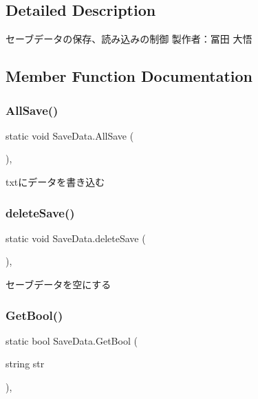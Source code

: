 \subsection{Detailed Description}
セーブデータの保存、読み込みの制御 製作者：冨田 大悟 



\subsection{Member Function Documentation}
\mbox{\label{class_save_data_a0e53b6d48717b1ee274041ed6e4a2cbe}} 
\subsubsection{\texorpdfstring{All\+Save()}{AllSave()}}
{\footnotesize\ttfamily static void Save\+Data.\+All\+Save (\begin{DoxyParamCaption}{ }\end{DoxyParamCaption})\hspace{0.3cm}{\ttfamily [inline]}, {\ttfamily [static]}}



txtにデータを書き込む 

\mbox{\label{class_save_data_a9fa3e3db072ebafa6023e8cb2be35eb5}} 
\subsubsection{\texorpdfstring{delete\+Save()}{deleteSave()}}
{\footnotesize\ttfamily static void Save\+Data.\+delete\+Save (\begin{DoxyParamCaption}{ }\end{DoxyParamCaption})\hspace{0.3cm}{\ttfamily [inline]}, {\ttfamily [static]}}



セーブデータを空にする 

\mbox{\label{class_save_data_a5f30e9dfb2fde8be2780d6e79390ed92}} 
\subsubsection{\texorpdfstring{Get\+Bool()}{GetBool()}}
{\footnotesize\ttfamily static bool Save\+Data.\+Get\+Bool (\begin{DoxyParamCaption}\item[{string}]{str }\end{DoxyParamCaption})\hspace{0.3cm}{\ttfamily [inline]}, {\ttfamily [static]}}



